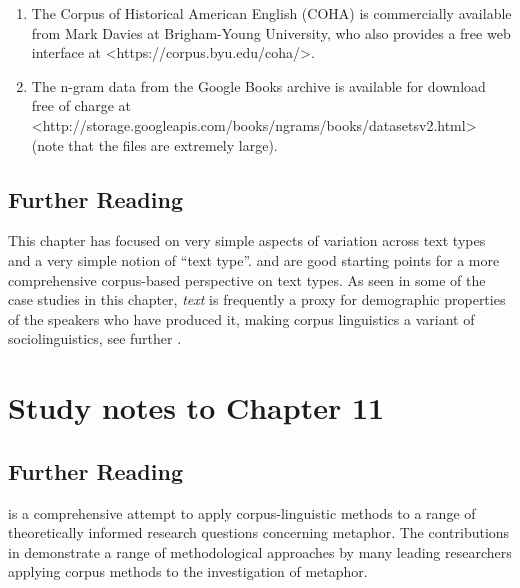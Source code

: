 \begin{enumerate}
  \item The Corpus of Historical American English (COHA) is commercially available from Mark Davies at Brigham-Young University, who also provides a free web interface at <https://corpus.byu.edu/coha/>.
  \item The n-gram data from the Google Books archive is available for download free of charge at <http://storage.googleapis.com/books/ngrams/books/datasetsv2.html> (note that the files are extremely large).
\end{enumerate}

\subsection{Further Reading}
\label{sec:furtherreading10}

This chapter has focused on very simple aspects of variation across text types and a very simple notion of “text type”. \citet{biber_variation_1988} and \citet{biber_typology_1989} are good starting points for a more comprehensive corpus-based perspective on text types. As seen in some of the case studies in this chapter, \textit{text} is frequently a proxy for demographic properties of the speakers who have produced it, making corpus linguistics a variant of sociolinguistics, see further \citet{baker_sociolinguistics_2010}.

\section{Study notes to Chapter 11}
\label{sec:studynotes11}

\subsection{Further Reading}
\label{sec:furtherreading11}

\citet{deignan_metaphor_2005} is a comprehensive attempt to apply corpus-linguistic methods to a range of theoretically informed research questions concerning metaphor. The contributions in \citet{stefanowitsch_corpus-based_2006} demonstrate a range of methodological approaches by many leading researchers applying corpus methods to the investigation of metaphor.

